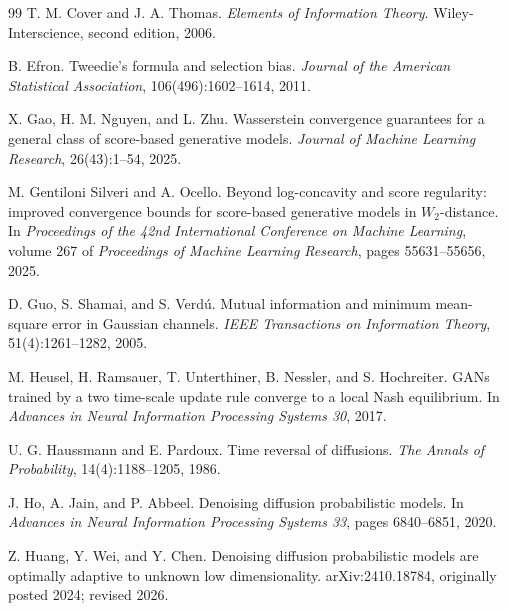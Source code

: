 \documentclass[11pt]{article}
\theoremstyle{definition}
\begin{document}
\begin{thebibliography}{99}
T. M. Cover and J. A. Thomas.
\newblock \emph{Elements of Information Theory}.
\newblock Wiley-Interscience, second edition, 2006.

B. Efron.
\newblock Tweedie's formula and selection bias.
\newblock \emph{Journal of the American Statistical Association}, 106(496):1602--1614, 2011.

X. Gao, H. M. Nguyen, and L. Zhu.
\newblock Wasserstein convergence guarantees for a general class of score-based generative models.
\newblock \emph{Journal of Machine Learning Research}, 26(43):1--54, 2025.

M. Gentiloni Silveri and A. Ocello.
\newblock Beyond log-concavity and score regularity: improved convergence bounds for score-based generative models in $W_2$-distance.
\newblock In \emph{Proceedings of the 42nd International Conference on Machine Learning}, volume 267 of \emph{Proceedings of Machine Learning Research}, pages 55631--55656, 2025.

D. Guo, S. Shamai, and S. Verd\'u.
\newblock Mutual information and minimum mean-square error in Gaussian channels.
\newblock \emph{IEEE Transactions on Information Theory}, 51(4):1261--1282, 2005.

M. Heusel, H. Ramsauer, T. Unterthiner, B. Nessler, and S. Hochreiter.
\newblock GANs trained by a two time-scale update rule converge to a local Nash equilibrium.
\newblock In \emph{Advances in Neural Information Processing Systems 30}, 2017.

U. G. Haussmann and E. Pardoux.
\newblock Time reversal of diffusions.
\newblock \emph{The Annals of Probability}, 14(4):1188--1205, 1986.

J. Ho, A. Jain, and P. Abbeel.
\newblock Denoising diffusion probabilistic models.
\newblock In \emph{Advances in Neural Information Processing Systems 33}, pages 6840--6851, 2020.

Z. Huang, Y. Wei, and Y. Chen.
\newblock Denoising diffusion probabilistic models are optimally adaptive to unknown low dimensionality.
\newblock arXiv:2410.18784, originally posted 2024; revised 2026.


\end{thebibliography}
\end{document}
